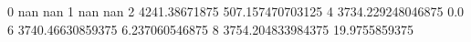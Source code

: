 0 nan nan
1 nan nan
2 4241.38671875 507.157470703125
4 3734.229248046875 0.0
6 3740.46630859375 6.237060546875
8 3754.204833984375 19.9755859375
